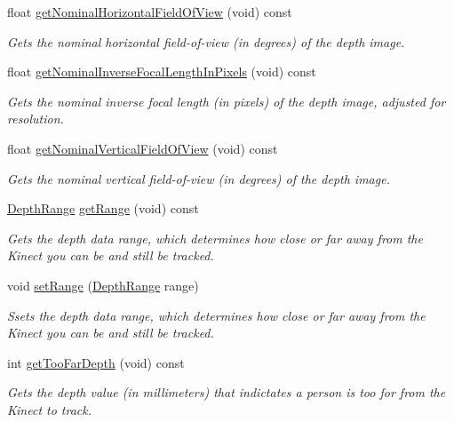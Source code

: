 \begin{DoxyCompactItemize}
float \hyperlink{class_depth_image_stream_ae9311cbca331df35191d02a43637844e}{get\-Nominal\-Horizontal\-Field\-Of\-View} (void) const 
\begin{DoxyCompactList}\small\item\em \-Gets the nominal horizontal field-\/of-\/view (in degrees) of the depth image. \end{DoxyCompactList}\item 
float \hyperlink{class_depth_image_stream_a2306e7c6675c7f9f10baddb7ed4967c9}{get\-Nominal\-Inverse\-Focal\-Length\-In\-Pixels} (void) const 
\begin{DoxyCompactList}\small\item\em \-Gets the nominal inverse focal length (in pixels) of the depth image, adjusted for resolution. \end{DoxyCompactList}\item 
float \hyperlink{class_depth_image_stream_a221350262048d45e55043959b458a7c7}{get\-Nominal\-Vertical\-Field\-Of\-View} (void) const 
\begin{DoxyCompactList}\small\item\em \-Gets the nominal vertical field-\/of-\/view (in degrees) of the depth image. \end{DoxyCompactList}\item 
\hyperlink{depth_range_8h_a7ff3cd5da502f1a6aa36d6d8adaf40ad}{\-Depth\-Range} \hyperlink{class_depth_image_stream_a63fda9a79f5522851fc7100e5092becf}{get\-Range} (void) const 
\begin{DoxyCompactList}\small\item\em \-Gets the depth data range, which determines how close or far away from the \-Kinect you can be and still be tracked. \end{DoxyCompactList}\item 
void \hyperlink{class_depth_image_stream_a6c3c3a3cd012676e1a0096022953f574}{set\-Range} (\hyperlink{depth_range_8h_a7ff3cd5da502f1a6aa36d6d8adaf40ad}{\-Depth\-Range} range)
\begin{DoxyCompactList}\small\item\em \-Ssets the depth data range, which determines how close or far away from the \-Kinect you can be and still be tracked. \end{DoxyCompactList}\item 
int \hyperlink{class_depth_image_stream_a8363318fbb6962ec4fcbf69fb14fe04b}{get\-Too\-Far\-Depth} (void) const 
\begin{DoxyCompactList}\small\item\em \-Gets the depth value (in millimeters) that indictates a person is too for from the \-Kinect to track. \end{DoxyCompactList}\item 

\end{DoxyCompactItemize}
